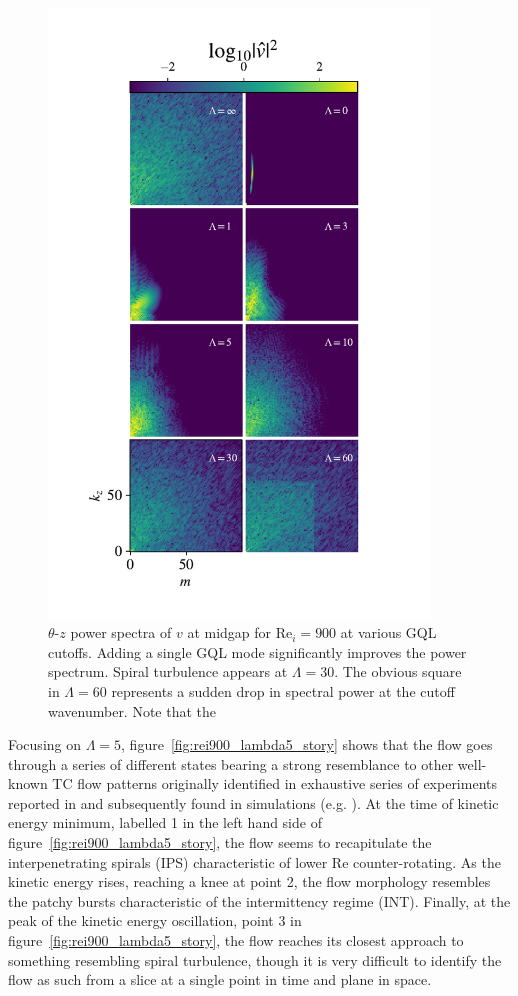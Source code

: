 \documentclass[openacc]{rstransa}%
\newcommand{\Reyn}{\mathrm{Re}}
\begin{document}
\begin{figure}
    \centering
    \includegraphics[width=0.9\textwidth]{../figs/rei900_spectra.pdf}
    \caption{$\theta$-$z$ power spectra of $v$ at midgap for $\Reyn_i = 900$ at various GQL cutoffs. Adding a single GQL mode significantly improves the power spectrum. Spiral turbulence appears at $\Lambda=30$. The obvious square in $\Lambda = 60$ represents a sudden drop in spectral power at the cutoff wavenumber. Note that the}
    \label{fig:rei900_spectra}
\end{figure}
Focusing on $\Lambda=5$, figure~\ref{fig:rei900_lambda5_story} shows that the flow goes through a series of different states bearing a strong resemblance to other well-known TC flow patterns originally identified in exhaustive series of experiments reported in \cite{1984JFM...146...45M} and subsequently found in simulations (e.g. \cite{2009PhRvE..80d6315M}). At the time of kinetic energy minimum, labelled 1 in the left hand side of figure~\ref{fig:rei900_lambda5_story}, the flow seems to recapitulate the interpenetrating spirals (IPS) characteristic of lower $\Reyn$ counter-rotating. As the kinetic energy rises, reaching a knee at point 2, the flow morphology resembles the patchy bursts characteristic of the intermittency regime (INT). Finally, at the peak of the kinetic energy oscillation, point 3 in figure~\ref{fig:rei900_lambda5_story}, the flow reaches its closest approach to something resembling spiral turbulence, though it is very difficult to identify the flow as such from a slice at a single point in time and plane in space.
\end{document}
